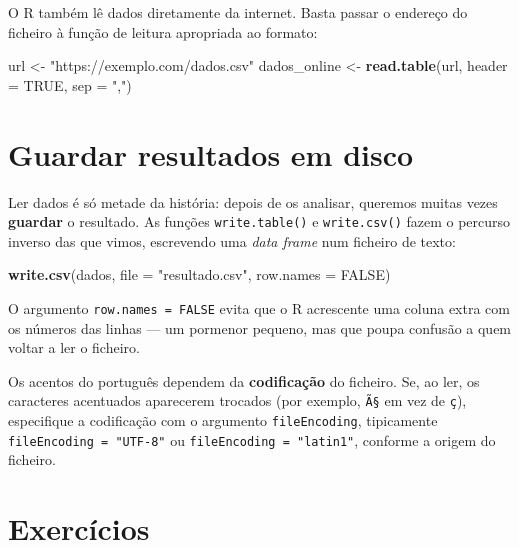 \documentclass[
  portuguese,
  11pt,
  openany]{book}
\newenvironment{Shaded}{\begin{snugshade}}{\end{snugshade}}
\newcommand{\AttributeTok}[1]{\textcolor[rgb]{0.13,0.29,0.53}{#1}}
\newcommand{\ConstantTok}[1]{\textcolor[rgb]{0.56,0.35,0.01}{#1}}
\newcommand{\FunctionTok}[1]{\textcolor[rgb]{0.13,0.29,0.53}{\textbf{#1}}}
\newcommand{\NormalTok}[1]{#1}
\newcommand{\OtherTok}[1]{\textcolor[rgb]{0.56,0.35,0.01}{#1}}
\newcommand{\StringTok}[1]{\textcolor[rgb]{0.31,0.60,0.02}{#1}}
\begin{document}
O R também lê dados diretamente da internet. Basta passar o endereço do ficheiro à
função de leitura apropriada ao formato:

\begin{Shaded}
\begin{Highlighting}[]
\NormalTok{url }\OtherTok{\textless{}{-}} \StringTok{"https://exemplo.com/dados.csv"}
\NormalTok{dados\_online }\OtherTok{\textless{}{-}} \FunctionTok{read.table}\NormalTok{(url, }\AttributeTok{header =} \ConstantTok{TRUE}\NormalTok{, }\AttributeTok{sep =} \StringTok{","}\NormalTok{)}
\end{Highlighting}
\end{Shaded}

\section{Guardar resultados em disco}\label{guardar-resultados-em-disco}

Ler dados é só metade da história: depois de os analisar, queremos muitas vezes
\textbf{guardar} o resultado. As funções \texttt{write.table()} e \texttt{write.csv()} fazem o percurso
inverso das que vimos, escrevendo uma \emph{data frame} num ficheiro de texto:

\begin{Shaded}
\begin{Highlighting}[]
\FunctionTok{write.csv}\NormalTok{(dados, }\AttributeTok{file =} \StringTok{"resultado.csv"}\NormalTok{, }\AttributeTok{row.names =} \ConstantTok{FALSE}\NormalTok{)}
\end{Highlighting}
\end{Shaded}

O argumento \texttt{row.names\ =\ FALSE} evita que o R acrescente uma coluna extra com os
números das linhas --- um pormenor pequeno, mas que poupa confusão a quem voltar a ler
o ficheiro.

Os acentos do português dependem da \textbf{codificação} do ficheiro. Se, ao ler, os
caracteres acentuados aparecerem trocados (por exemplo, \texttt{Ã§} em vez de \texttt{ç}),
especifique a codificação com o argumento \texttt{fileEncoding}, tipicamente
\texttt{fileEncoding\ =\ "UTF-8"} ou \texttt{fileEncoding\ =\ "latin1"}, conforme a origem do ficheiro.

\section{Exercícios}\label{exercuxedcios-9}
\end{document}
